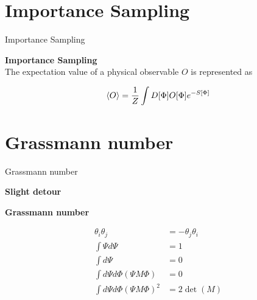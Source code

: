 \documentclass[10pt]{beamer}
\begin{document}
 \section{Importance Sampling}
 \begin{frame}{Importance Sampling}
     \begin{center} \textbf{Importance Sampling}\\
        The expectation value of a physical observable $O$ is represented as \end{center}
        \begin{align}
            \braket{O} = \frac{1}{Z}\int D[\Phi]O[\Phi]e^{-S[\Phi]}
        \end{align}

 \end{frame}

 \section{Grassmann number}
 \begin{frame}{Grassmann number}
     \begin{center} \textbf{Slight detour} \end{center}
     \begin{center} \textbf{Grassmann number}\end{center} \begin{align*}
    \theta_i\theta_j &= -\theta_j\theta_i \\
    \int \Psi d\Psi & = 1\\
    \int d\Psi & = 0 \\
    \int d\Psi d\Phi {(\Psi M \Phi)} & = 0\\
    \int d\Psi d\Phi {(\Psi M \Phi)}^2 & = 2 \det(M)
    \end{align*} 
  \end{frame}
\end{document}
